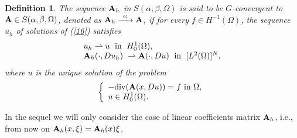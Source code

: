 \documentclass[11pt, epsf]{amsart}
\newtheorem{Def}{Definition}
\begin{document}
\begin{Def}\emph{ The sequence $\text{\textbf{A}}_h$ in $S(\alpha,\beta,\Omega)$
is said to be $G$-convergent to $\text{\textbf{A}}\in S(\alpha,\beta,\Omega)$, denoted as $\text{\textbf{A}}_h\xrightarrow{\;\,\text{\tiny G}\;\,}\text{\textbf{A}}$, if for every $f\in H^{-1}(\Omega)$, the sequence $u_h$ of solutions  of (\ref{16}) satisfies
$$
\left. \begin{array}{l}
u_{h} \rightharpoonup {u}\;\mbox{ in }\;H_0^1(\Omega), \\
\text{\textbf{A}}_{h}(\cdot,Du_{h})\;\rightharpoonup {\text{\textbf{A}}(\cdot,Du)}\;\mbox{ in }
\;[L^2(\Omega)]^N,
\end{array} \right.
$$
where $u$ is the unique solution of the problem
\begin{equation}\label{17}
\left\{ \begin{array}{l}
-{\rm div}(\text{\textbf{A}}(x,Du)) = f \mbox{ in }\Omega,\\
u\in H_0^1(\Omega).
\end{array} \right.
\end{equation}
}
\end{Def}
In the sequel we will only consider the case of linear coefficients matrix $\text{\textbf{A}}_h$, i.e., from now on  $\text{\textbf{A}}_h(x,\xi) =\text{\textbf{A}}_h(x)\xi$.
\end{document}
